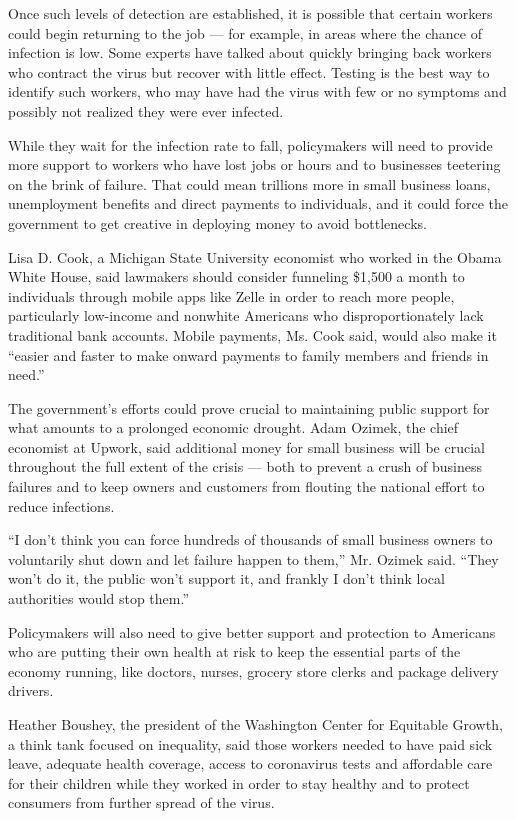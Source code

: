 Once such levels of detection are established, it is possible that
certain workers could begin returning to the job --- for example, in
areas where the chance of infection is low. Some experts have talked
about quickly bringing back workers who contract the virus but recover
with little effect. Testing is the best way to identify such workers,
who may have had the virus with few or no symptoms and possibly not
realized they were ever infected.

While they wait for the infection rate to fall, policymakers will need
to provide more support to workers who have lost jobs or hours and to
businesses teetering on the brink of failure. That could mean trillions
more in small business loans, unemployment benefits and direct payments
to individuals, and it could force the government to get creative in
deploying money to avoid bottlenecks.

Lisa D. Cook, a Michigan State University economist who worked in the
Obama White House, said lawmakers should consider funneling \$1,500 a
month to individuals through mobile apps like Zelle in order to reach
more people, particularly low-income and nonwhite Americans who
disproportionately lack traditional bank accounts. Mobile payments, Ms.
Cook said, would also make it ``easier and faster to make onward
payments to family members and friends in need.''

The government's efforts could prove crucial to maintaining public
support for what amounts to a prolonged economic drought. Adam Ozimek,
the chief economist at Upwork, said additional money for small business
will be crucial throughout the full extent of the crisis --- both to
prevent a crush of business failures and to keep owners and customers
from flouting the national effort to reduce infections.

``I don't think you can force hundreds of thousands of small business
owners to voluntarily shut down and let failure happen to them,'' Mr.
Ozimek said. ``They won't do it, the public won't support it, and
frankly I don't think local authorities would stop them.''

Policymakers will also need to give better support and protection to
Americans who are putting their own health at risk to keep the essential
parts of the economy running, like doctors, nurses, grocery store clerks
and package delivery drivers.

Heather Boushey, the president of the Washington Center for Equitable
Growth, a think tank focused on inequality, said those workers needed to
have paid sick leave, adequate health coverage, access to coronavirus
tests and affordable care for their children while they worked in order
to stay healthy and to protect consumers from further spread of the
virus.

